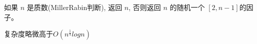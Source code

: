 如果 $n$ 是质数(MillerRabin判断), 返回 $n$, 否则返回 $n$ 
的随机一个 $[2, n - 1]$的因子。

复杂度略微高于$O(n^{\frac{1}{4}}logn)$
